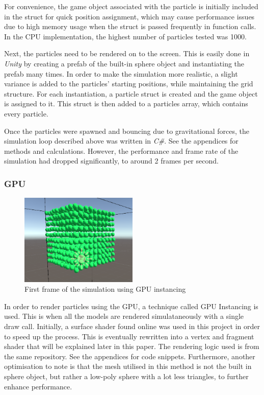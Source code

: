 \documentclass[12pt]{article}
\begin{document}
    For convenience, the game object associated with the particle is initially included in the struct for quick position assignment, which may cause performance issues due to high memory usage when the struct is passed frequently in function calls. In the CPU implementation, the highest number of particles tested was 1000.
    
    Next, the particles need to be rendered on to the screen. This is easily done in \textit{Unity} by creating a prefab of the built-in sphere object and instantiating the prefab many times. In order to make the simulation more realistic, a slight variance is added to the particles' starting positions, while maintaining the grid structure. For each instantiation, a particle struct is created and the game object is assigned to it. This struct is then added to a particles array, which contains every particle.

    Once the particles were spawned and bouncing due to gravitational forces, the simulation loop described above was written in \textit{C\#}. See the appendices for methods and calculations. However, the performance and frame rate of the simulation had dropped significantly, to around 2 frames per second.

    \subsubsection{GPU}

    \begin{figure}[H]
        \begin{center}
            \includegraphics[width=0.5\textwidth]{firstFrameGPU.png}
            \caption{First frame of the simulation using GPU instancing}
        \end{center}
    \end{figure}

    In order to render particles using the GPU, a technique called GPU Instancing is used. This is when all the models are rendered simulataneously with a single draw call. Initially, a surface shader found online was used in this project in order to speed up the process\cite{gpuinstanceshader}. This is eventually rewritten into a vertex and fragment shader that will be explained later in this paper. The rendering logic used is from the same repository. See the appendices for code snippets. Furthermore, another optimisation to note is that the mesh utilised in this method is not the built in sphere object, but rather a low-poly sphere with a lot less triangles, to further enhance performance.
\end{document}

